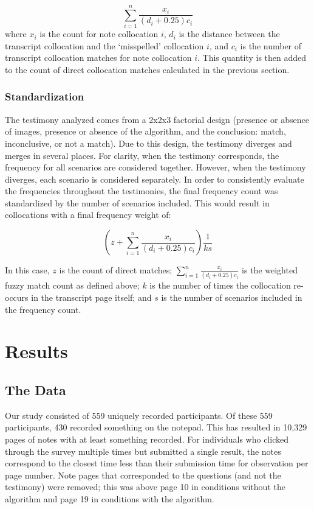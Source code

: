 \documentclass[print]{nuthesis}
\begin{document}
\[
\sum_{i=1}^n\frac{x_i}{(d_i+0.25)c_i}
\]
where \(x_i\) is the count for note collocation \(i\), \(d_i\) is the distance between the transcript collocation and the `misspelled' collocation \(i\), and \(c_i\) is the number of transcript collocation matches for note collocation \(i\).
This quantity is then added to the count of direct collocation matches calculated in the previous section.

\hypertarget{standardization}{%
\subsubsection{Standardization}\label{standardization}}

The testimony analyzed comes from a 2x2x3 factorial design (presence or absence of images, presence or absence of the algorithm, and the conclusion: match, inconclusive, or not a match).
Due to this design, the testimony diverges and merges in several places.
For clarity, when the testimony corresponds, the frequency for all scenarios are considered together.
However, when the testimony diverges, each scenario is considered separately.
In order to consistently evaluate the frequencies throughout the testimonies, the final frequency count was standardized by the number of scenarios included.
This would result in collocations with a final frequency weight of:

\[
(z+\sum_{i=1}^n\frac{x_i}{(d_i+0.25)c_i})\frac{1}{ks}
\]

In this case, \(z\) is the count of direct matches; \(\sum_{i=1}^n\frac{x_i}{(d_i+0.25)c_i}\) is the weighted fuzzy match count as defined above; \(k\) is the number of times the collocation re-occurs in the transcript page itself; and \(s\) is the number of scenarios included in the frequency count.

\hypertarget{results-1}{%
\section{Results}\label{results-1}}

\hypertarget{the-data}{%
\subsection{The Data}\label{the-data}}

Our study consisted of 559 uniquely recorded participants.
Of these 559 participants, 430 recorded something on the notepad.
This has resulted in 10,329 pages of notes with at least something recorded.
For individuals who clicked through the survey multiple times but submitted a single result, the notes correspond to the closest time less than their submission time for observation per page number.
Note pages that corresponded to the questions (and not the testimony) were removed; this was above page 10 in conditions without the algorithm and page 19 in conditions with the algorithm.
\end{document}
